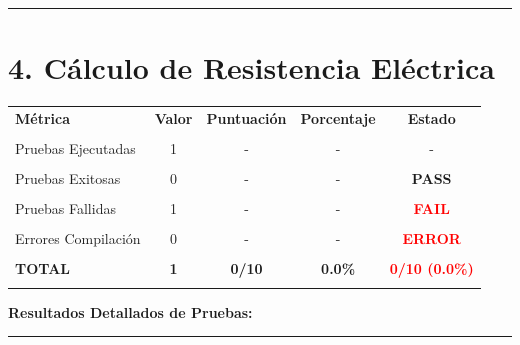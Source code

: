 \documentclass[11pt]{article}
\begin{document}
\vspace{1cm}
\hrule
\vspace{0.5cm}


\vspace{0.5cm}
\section*{\textbf{4.} Cálculo de Resistencia Eléctrica}


\begin{table}[h!]
\centering
\begin{tabular}{l|c|c|c|c}
\hline
\rowcolor{lightgray}
\textbf{Métrica} & \textbf{Valor} & \textbf{Puntuación} & \textbf{Porcentaje} & \textbf{Estado} \\\\
\hline
Pruebas Ejecutadas & 1 & - & - & - \\\\
Pruebas Exitosas & 0 & - & - & \textcolor{commentgreen}{\textbf{PASS}} \\\\
Pruebas Fallidas & 1 & - & - & \textcolor{red}{\textbf{FAIL}} \\\\
Errores Compilación & 0 & - & - & \textcolor{red}{\textbf{ERROR}} \\\\
\hline
\rowcolor{lightgray}
\textbf{TOTAL} & \textbf{1} & \textbf{0/10} & \textbf{0.0\%} & \textcolor{red}{\textbf{0/10 (0.0\%)}} \\\\
\hline
\end{tabular}
\end{table}


\vspace{0.5cm}
\textbf{Resultados Detallados de Pruebas:}\\[0.3cm]
\begin{center}
%
\end{center}

\vspace{1cm}
\hrule
\vspace{0.5cm}
\end{document}
